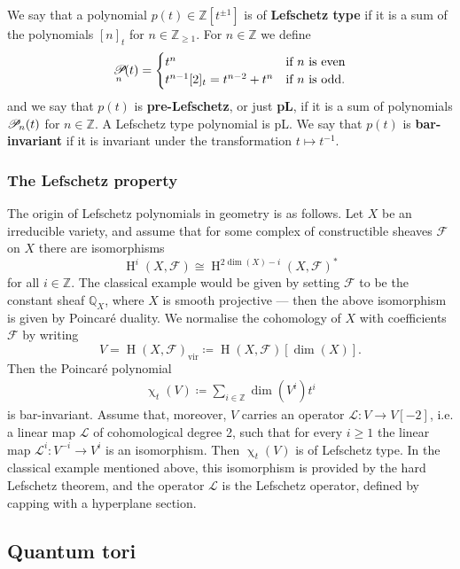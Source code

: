 \documentclass{amsart}
\DeclareMathOperator{\pl}{\mathscr{P}\!}
\DeclareMathOperator{\HO}{H}
\DeclareMathOperator{\vir}{vir}
\def\!{\mskip-\thinmuskip}
\renewcommand{\chi}{\upchi}
\theoremstyle{plain}%
\theoremstyle{definition}
\theoremstyle{remark}
\begin{document}
We say that a polynomial $p(t)\in\mathbb{Z}[t^{\pm 1}]$ is of \textbf{Lefschetz type} if it is a sum of the polynomials $[n]_t$ for $n\in\mathbb{Z}_{\geq 1}$.  For $n\in\mathbb{Z}$ we define
\begin{equation}\label{plPolys}
\pl_n(t)=\begin{cases}t^n&\textrm{if }n\textrm{ is even}\\ t^{n-1}[2]_t=t^{n-2}+t^n &\textrm{if }n \textrm{ is odd.} \end{cases}
\end{equation}
and we say that $p(t)$ is \textbf{pre-Lefschetz}, or just \textbf{pL}, if it is a sum of polynomials $\pl_n(t)$ for $n\in\mathbb{Z}$.   A Lefschetz type polynomial is pL.  We say that $p(t)$ is \textbf{bar-invariant} if it is invariant under the transformation $t\mapsto t^{-1}$.  


\subsubsection{The Lefschetz property}
The origin of Lefschetz polynomials in geometry is as follows.  Let $X$ be an irreducible variety, and assume that for some complex of constructible sheaves $\mathcal{F}$ on $X$ there are isomorphisms
\[
\HO^i(X,\mathcal{F})\cong \HO^{2\dim(X)-i}(X,\mathcal{F})^*
\]
for all $i\in\mathbb{Z}$.  The classical example would be given by setting $\mathcal{F}$ to be the constant sheaf $\mathbb{Q}_X$, where $X$ is smooth projective --- then the above isomorphism is given by Poincar\'e duality.  We normalise the cohomology of $X$ with coefficients $\mathcal{F}$ by writing
\[
V=\HO(X,\mathcal{F})_{\vir}\coloneqq \HO(X,\mathcal{F})[\dim(X)].
\]
Then the Poincar\'e polynomial
\begin{align}\label{chit}
\chi_t(V)\coloneqq\sum_{i\in \mathbb{Z}}\dim(V^i )t^{i}
\end{align} is bar-invariant.  Assume that, moreover, $V$ carries an operator $\mathscr{L}\colon V\rightarrow V[-2]$, i.e. a linear map $\mathscr{L}$ of cohomological degree 2, such that for every $i\geq 1$ the linear map $\mathscr{L}^i\colon V^{-i}\rightarrow V^i$ is an isomorphism.  Then $\chi_t(V)$ is of Lefschetz type.  In the classical example mentioned above, this isomorphism is provided by the hard Lefschetz theorem, and the operator $\mathcal{L}$ is the Lefschetz operator, defined by capping with a hyperplane section.

\subsection{Quantum tori}\label{qtori}
\end{document}
